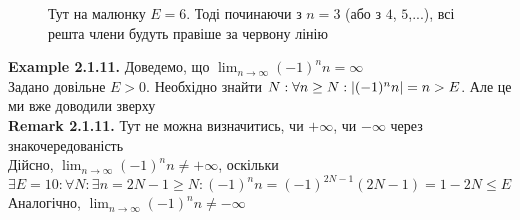 \documentclass[a4paper, 14pt]{extarticle}
\def\huge{\displaystyle}
\def\bigline{\vspace{5mm}\\}
\def\ex#1{\textbf{Example {#1}}}
\def\rm#1{\textbf{Remark {#1}}}
\def\bigline{\vspace{5mm}\\}
\begin{document}
	\begin{figure}[H]
\centering
\resizebox{0.9\textwidth}{!} {
}
\caption{Тут на малюнку $E = 6$. Тоді починаючи з $n=3$ (або з $4$, $5$,...), всі решта члени будуть правіше за червону лінію}
\end{figure}
\ex{2.1.11.} Доведемо, що $\huge \lim_{n \to \infty} (-1)^n n = \infty$\\
Задано довільне $E > 0$. Необхідно знайти $N: \forall n \geq N: \\ |(-1)^n n| = n > E$.
Але це ми вже доводили зверху
\bigline
\rm{2.1.11.} Тут не можна визначитись, чи $+\infty$, чи $-\infty$ через знакочередованість\\
Дійсно, $\huge \lim_{n \to \infty} (-1)^n n \neq +\infty$, оскільки\\
$\exists E = 10: \forall N: \exists n = 2N-1 \geq N: (-1)^n n = (-1)^{2N-1} (2N-1) = 1-2N \leq E$\\
Аналогічно, $\huge \lim_{n \to \infty} (-1)^n n \neq -\infty$
	
	
\end{document}
